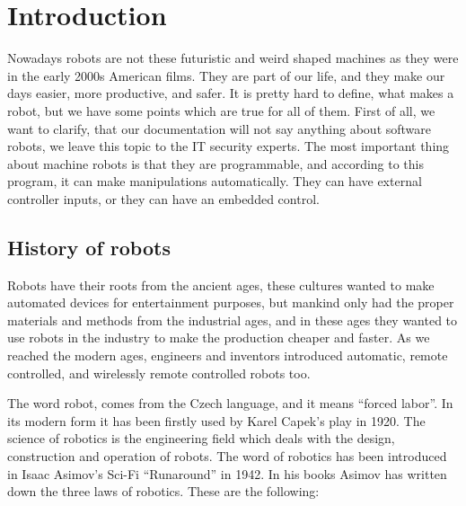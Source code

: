 \newpage

\thispagestyle{empty}

\chapter{Introduction}

	\hspace{15pt}Nowadays robots are not these futuristic and weird shaped machines as they were in the early 2000s American films. They are part of our life, and they make our days easier, more productive, and safer. It is pretty hard to define, what makes a robot, but we have some points which are true for all of them. First of all, we want to clarify, that our documentation will not say anything about software robots, we leave this topic to the IT security experts. The most important thing about machine robots is that they are programmable, and according to this program, it can make manipulations automatically. They can have external controller inputs, or they can have an embedded control.






	\section{History of robots}

		\hspace{15pt}Robots have their roots from the ancient ages, these cultures wanted to make automated devices for entertainment purposes, but mankind only had the proper materials and methods from the industrial ages, and in these ages they wanted to use robots in the industry to make the production cheaper and faster. As we reached the modern ages, engineers and inventors introduced automatic, remote controlled, and wirelessly remote controlled robots too.


		The word robot, comes from the Czech language, and it means “forced labor”. In its modern form it has been firstly used by Karel Capek’s play in 1920. The science of robotics is the engineering field which deals with the design, construction and operation of robots. The word of robotics has been introduced in Isaac Asimov’s Sci-Fi “Runaround” in 1942. In his books Asimov has written down the three laws of robotics. These are the following:

